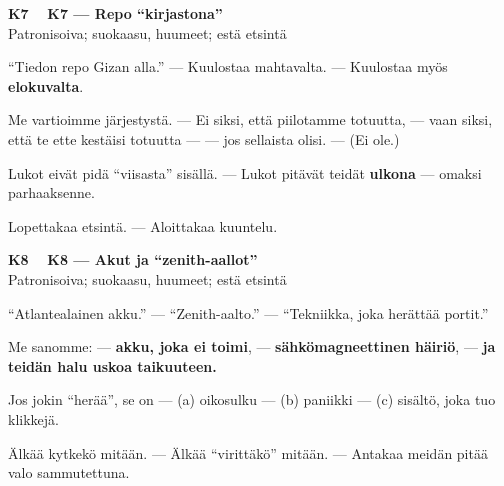\documentclass[a4paper,11pt]{article}
\begin{document}
\filbreak
\vspace{0.9mm}
\noindent
\begin{tcolorbox}[
  colframe=eaglecol,
  colback=white,
  boxrule=0.8pt,
  arc=0pt,
  outer arc=0pt,
  left=2.5mm, right=2.5mm, top=2mm, bottom=2mm,
  boxsep=0.5mm,
  sharp corners,
  enhanced,
  breakable=false
]
{\large\ttfamily\bfseries K7}~~
{\normalsize\bfseries K7 --- Repo ``kirjastona''}\\[0.2em]
{\small\color{black!65} Patronisoiva; suokaasu, huumeet; estä etsintä}\\[0.35em]
{\normalsize\raggedright ``Tiedon repo Gizan alla.'' --- Kuulostaa mahtavalta. --- Kuulostaa myös \textbf{elokuvalta}.

Me vartioimme järjestystä. --- Ei siksi, että piilotamme totuutta, --- vaan siksi, että te ette kestäisi totuutta --- --- jos sellaista olisi. --- (Ei ole.)

Lukot eivät pidä ``viisasta'' sisällä. --- Lukot pitävät teidät \textbf{ulkona} --- omaksi parhaaksenne.

Lopettakaa etsintä. --- Aloittakaa kuuntelu.}
\end{tcolorbox}

\filbreak
\vspace{0.9mm}
\noindent
\begin{tcolorbox}[
  colframe=eaglecol,
  colback=white,
  boxrule=0.8pt,
  arc=0pt,
  outer arc=0pt,
  left=2.5mm, right=2.5mm, top=2mm, bottom=2mm,
  boxsep=0.5mm,
  sharp corners,
  enhanced,
  breakable=false
]
{\large\ttfamily\bfseries K8}~~
{\normalsize\bfseries K8 --- Akut ja ``zenith-aallot''}\\[0.2em]
{\small\color{black!65} Patronisoiva; suokaasu, huumeet; estä etsintä}\\[0.35em]
{\normalsize\raggedright ``Atlantealainen akku.'' --- ``Zenith-aalto.'' --- ``Tekniikka, joka herättää portit.''

Me sanomme: --- \textbf{akku, joka ei toimi}, --- \textbf{sähkömagneettinen häiriö}, --- \textbf{ja teidän halu uskoa taikuuteen.}

Jos jokin ``herää'', se on --- (a) oikosulku --- (b) paniikki --- (c) sisältö, joka tuo klikkejä.

Älkää kytkekö mitään. --- Älkää ``virittäkö'' mitään. --- Antakaa meidän pitää valo sammutettuna.}
\end{tcolorbox}
\end{document}
